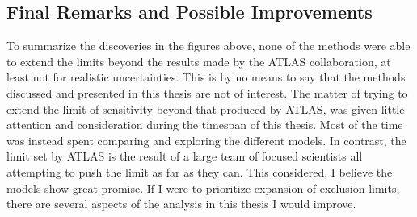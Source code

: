 \subsection*{Final Remarks and Possible Improvements}
To summarize the discoveries in the figures above, none of the methods were able to extend the limits beyond the results made by the \ac{ATLAS} collaboration, at least not for realistic 
uncertainties. This is by no means to say that the methods discussed and presented in this thesis are not of interest. The matter of trying to extend the limit of sensitivity 
beyond that produced by \ac{ATLAS}, was given little attention and consideration during the timespan of this thesis. Most of the time was instead spent comparing and exploring the 
different models. In contrast, the limit set by \ac{ATLAS} is the result of a large team of focused scientists all attempting to push the limit as far as they can. This considered, I believe 
the models show great promise. If I were to prioritize expansion of exclusion limits, there are several aspects of the analysis in this thesis I would improve.
